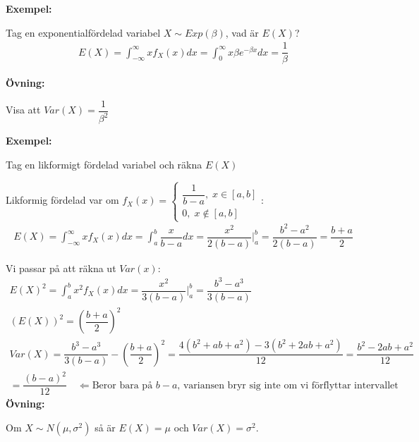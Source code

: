 \par\bigskip
\noindent\textbf{Exempel:}\par
\noindent Tag en exponentialfördelad variabel $X\sim Exp(\beta)$, vad är $E(X)$?
\begin{equation*}
  \begin{gathered}
    E(X) = \int_{-\infty}^{\infty}xf_X(x)dx = \int_{0}^{\infty}x\beta e^{-\beta x}dx = \dfrac{1}{\beta}
  \end{gathered}
\end{equation*}
\par\bigskip
\noindent\textbf{Övning:}\par
\noindent Visa att $Var(X) = \dfrac{1}{\beta^2}$
\par\bigskip
\noindent\textbf{Exempel:}\par
\noindent Tag en likformigt fördelad variabel och räkna $E(X)$\par
\noindent Likformig fördelad var om $f_X(x) = \begin{cases}\dfrac{1}{b-a},\; x\in[a,b]\\0,\;x\notin[a,b]\end{cases}$:
\begin{equation*}
  \begin{gathered}
    E(X) = \int_{-\infty}^{\infty}xf_X(x)dx = \int_{a}^{b}\dfrac{x}{b-a}dx = \dfrac{x^2}{2(b-a)}|_a^b = \dfrac{b^2-a^2}{2(b-a)} = \dfrac{b+a}{2}
  \end{gathered}
\end{equation*}
\par\bigskip
\noindent Vi passar på att räkna ut $Var(x):$
\begin{equation*}
  \begin{gathered}
    E(X)^2 = \int_{a}^{b}x^2f_X(x)dx = \dfrac{x^2}{3(b-a)}|_a^b = \dfrac{b^3-a^3}{3(b-a)}\\
    (E(X))^2 = \left(\dfrac{b+a}{2}\right)^2\\
    Var(X) = \dfrac{b^3-a^3}{3(b-a)} - \left(\dfrac{b+a}{2}\right)^2 = \dfrac{4(b^2+ab+a^2)-3(b^2+2ab+a^2)}{12} = \dfrac{b^2-2ab+a^2}{12}\\
    =\dfrac{(b-a)^2}{12}\quad\Leftarrow\text{Beror bara på $b-a$, variansen bryr sig inte om vi förflyttar intervallet}
  \end{gathered}
\end{equation*}
\newpage
\noindent\textbf{Övning:}\par
\noindent Om $X\sim N(\mu, \sigma^2)$ så är $E(X) = \mu$ och $Var(X) = \sigma^2$.\par
